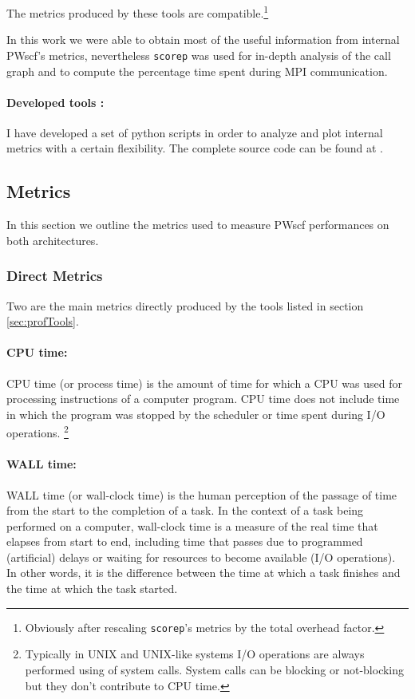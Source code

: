 \documentclass[a4paper,12pt]{article}
\begin{document}
The metrics produced by these tools are compatible.\footnote{ Obviously after rescaling \texttt{scorep}'s metrics by the total overhead factor.}

In this work we were able to obtain most of the useful information from internal PWscf's metrics, nevertheless \texttt{scorep} was used for in-depth analysis of the call graph and to compute the percentage time spent during MPI communication.

\paragraph{Developed tools :} I have developed a set of python scripts in order to analyze and plot internal metrics with a certain flexibility. The complete source code can be found at \cite{qetools}.


\subsection{Metrics}\label{sec:Metrics}

In this section we outline the metrics used to measure PWscf performances on both architectures.

\subsubsection{Direct Metrics}\label{sec:DirectMetrics}
Two are the main metrics directly produced by the tools listed in section \ref{sec:profTools}.

\paragraph{CPU time: } CPU time (or process time) is the amount of time for which a CPU was used for processing instructions of a computer program. CPU time does not include time in which the program was stopped by the scheduler or time spent during I/O operations. \footnote{Typically in UNIX and UNIX-like systems I/O operations are always performed using of system calls. System calls can be blocking or not-blocking but they don't contribute to CPU time.}

\paragraph{WALL time: } WALL time (or wall-clock time) is the human perception of the passage of time from the start to the completion of a task. 
In the context of a task being performed on a computer, wall-clock time is a measure of the real time that elapses from start to end, including time that passes due to programmed (artificial) delays or waiting for resources to become available (I/O operations). 
In other words, it is the difference between the time at which a task finishes and the time at which the task started.
\end{document}
